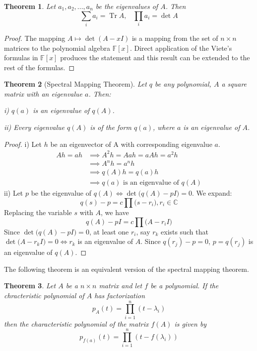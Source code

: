 \documentclass{article}
\DeclareMathOperator{\Tr}{Tr}
\newtheorem{theorem}{Theorem}[section]
\theoremstyle{remark}
\theoremstyle{definition}
\begin{document}
    \begin{theorem} 
    Let $a_1, a_2, ..., a_n$ be the eigenvalues of $A$. Then 
    \[\sum_i a_i = \Tr{A}, \;\;\; \prod_i a_i = \det{A}\]
    \end{theorem}

    \begin{proof}
    The mapping $A \mapsto \det{(A - x I)}$ is a mapping from the set of $n \times n$ matrices to the polynomial algebra $\mathbb{F}[x]$. Direct application of the Viete's formulas in $\mathbb{F}[x]$ produces the statement and this result can be extended to the rest of the formulas. 
    \end{proof}

    \begin{theorem}[Spectral Mapping Theorem]
    Let $q$ be any polynomial, $A$ a square matrix with an eigenvalue $a$. Then: 

    i) $q(a)$ is an eigenvalue of $q(A)$. 

    ii) Every eigenvalue $q(A)$ is of the form $q(a)$, where $a$ is an eigenvalue of $A$. 
    \end{theorem}
    \begin{proof} 
    i) Let $h$ be an eigenvector of A with corresponding eigenvalue $a$. 
    \begin{align*}
        Ah = ah & \implies A^{2} h = Aah = aAh = a^{2} h \\
     & \implies A^{n} h = a^{n} h   \\
     & \implies q(A)h = q(a)h \\
     & \implies q(a) \text{ is an eigenvalue of }q(A)
    \end{align*}
    ii) Let $p$ be the eigenvalue of $q(A) \iff \det{\big(q(A) - p I\big)} = 0$. We expand: 
    $$ q(s) - p = c\prod \big(s-r_{i}\big), r_{i} \in \mathbb{C} $$ 
    Replacing the variable $s$ with $A$, we have
    $$ q(A) - pI = c \prod \big(A-r_{i}I\big) $$
    Since $\det{\big( q(A) - pI\big)} = 0$, at least one $r_{i}$, say $r_{k}$ exists such that $\det{\big( A - r_{k} I \big)} = 0 \iff r_{k}$ is an eigenvalue of $A$. Since $q(r_{j})-p = 0$, $p = q(r_{j})$ is an eigenvalue of $q(A)$. 
    \end{proof}

    The following theorem is an equivalent version of the spectral mapping theorem.
    \begin{theorem}
    Let $A$ be a $n \times n$ matrix and let $f$ be a polynomial. If the chracteristic polynomial of $A$ has factorization 
    \[p_A (t) = \prod_{i = 1}^n (t - \lambda_i)\]
    then the characteristic polynomial of the matrix $f(A)$ is given by 
    \[p_{f(a)} (t) = \prod_{i = 1}^n (t - f(\lambda_i))\]
    \end{theorem}
\end{document}
